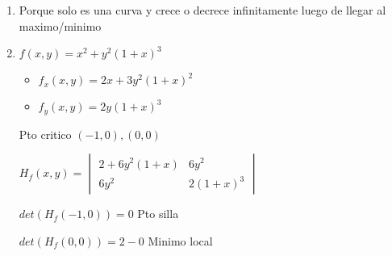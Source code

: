 \documentclass[../practica_06.tex]{subfiles}
\begin{document}
    \begin{enumerate}
        \item Porque solo es una curva y crece o decrece infinitamente luego de llegar al maximo/minimo
        \item $f(x,y) = x^2 + y^2(1+x)^3$
        
            \begin{itemize}
                \item $f_x(x,y) = 2x + 3y^2(1+x)^2$
                \item $f_y(x,y) = 2y(1+x)^3$
            \end{itemize}

            Pto critico $(-1,0),(0,0)$

            $H_f(x,y) = \begin{vmatrix}
                2 + 6y^2(1+x) & 6y^2 \\
                6y^2 & 2(1+x)^3
            \end{vmatrix}$

            $det(H_f(-1,0))= 0$ Pto silla

            $det(H_f(0,0))= 2 - 0$ Minimo local

    \end{enumerate}
\end{document}
